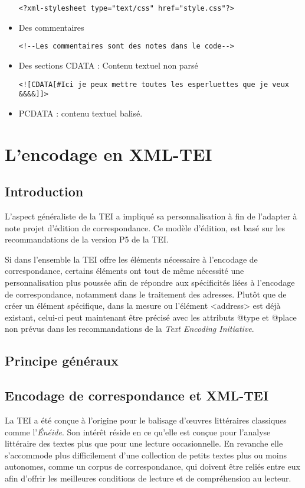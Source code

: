 \documentclass[18pt,a4paper,oneside]{book} %
\begin{document}
\begin{itemize}
\begin{lstlisting}
<?xml-stylesheet type="text/css" href="style.css"?>
\end{lstlisting}
\item Des commentaires
\begin{lstlisting}
<!--Les commentaires sont des notes dans le code-->
\end{lstlisting}
\item Des sections CDATA : Contenu textuel non parsé
\begin{lstlisting}
<![CDATA[#Ici je peux mettre toutes les esperluettes que je veux &&&&]]>
\end{lstlisting}
\item PCDATA : contenu textuel balisé. 
\end{itemize}

\part{L'encodage en XML-TEI}
\chapter{Introduction}

L'aspect généraliste de la TEI a impliqué sa personnalisation à fin de l'adapter à note projet d'édition de correspondance. Ce modèle d'édition, est basé sur les recommandations de la version P5 de la TEI. 

Si dans l'ensemble la TEI offre les éléments nécessaire à l'encodage de correspondance, certains éléments ont tout de même nécessité une personnalisation plus poussée afin de répondre aux spécificités liées à l'encodage de correspondance, notamment dans le traitement des adresses. Plutôt que de créer un élément spécifique, dans la mesure ou l'élément <address> est déjà existant, celui-ci peut maintenant être précisé avec les attributs @type et @place non prévus dans les recommandations de la \textit{Text Encoding Initiative}.

\chapter{Principe généraux}
\chapter{Encodage de correspondance et XML-TEI}

La TEI a été conçue à l'origine pour le balisage d'œuvres littéraires classiques comme l'\textit{Énéide}. Son intérêt réside en ce qu'elle est conçue pour l'analyse littéraire des textes plus que pour une lecture occasionnelle. En revanche elle s'accommode plus difficilement d'une collection de petits textes plus ou moins autonomes, comme un corpus de correspondance, qui doivent être reliés entre eux afin d'offrir les meilleures conditions de lecture et de compréhension au lecteur. 
\end{document}
